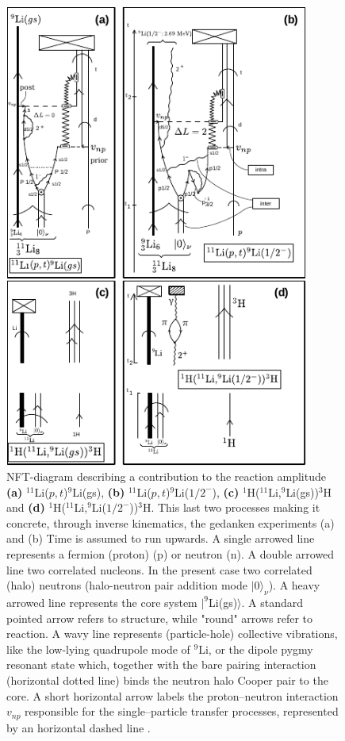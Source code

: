           \begin{figure}
          \centerline {
          \includegraphics*[width=10cm]{introduccion/figs/fig1_9_3xxx}
          }
          \caption{NFT-diagram  describing a contribution to the reaction amplitude \textbf{(a)} $^{11}$Li($p,t$)$^9$Li(gs), \textbf{(b)} $^{11}$Li($p,t$)$^9$Li($1/2^-$), \textbf{(c)}  $^{1}$H($^{11}$Li,$^9$Li(gs))$^3$H and \textbf{(d)} $^{1}$H($^{11}$Li,$^9$Li($1/2^-$))$^3$H. This last two processes making it concrete, through inverse kinematics, the gedanken experiments (a) and (b) Time is assumed to run upwards.
              	A single arrowed line represents a fermion (proton) (p) or neutron (n). A double arrowed line  two correlated nucleons. In the present case two correlated (halo) neutrons (halo-neutron pair addition mode $|0\rangle_{\nu}$). A heavy arrowed line represents  the core system $|^9$Li(gs)$\rangle$. A standard 
              	pointed arrow refers to structure, while "round" arrows refer to reaction. A wavy line represents (particle-hole) collective vibrations,
              	 like the low-lying quadrupole mode of $^9$Li, or the  dipole pygmy resonant state  which, together  with the bare pairing interaction (horizontal dotted line) binds the neutron  halo Cooper pair to the core.  A short horizontal arrow labels the proton--neutron interaction $v_{np}$ responsible for  the single--particle transfer  processes, represented by an horizontal dashed line .
}
\end{figure}

